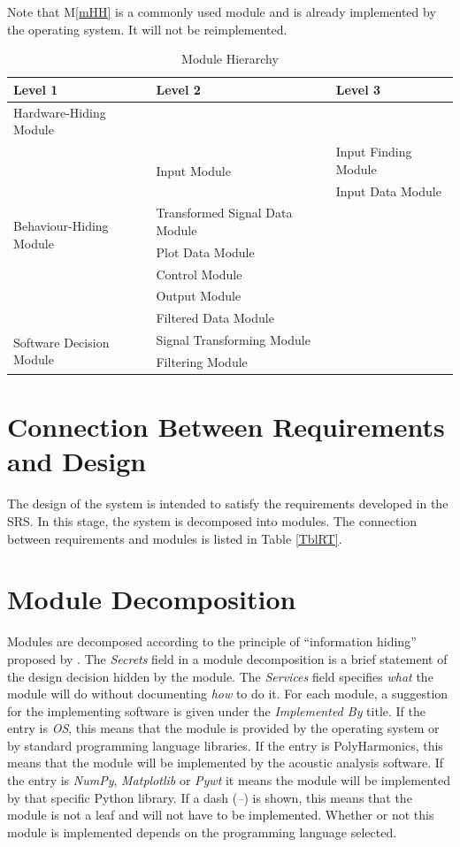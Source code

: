 \documentclass[12pt]{article}
\newcommand{\mref}[1]{M\ref{#1}}
\newcommand{\progname}{PolyHarmonics}
\begin{document}
Note that \mref{mHH} is a commonly used module and is already implemented by the 
operating
system.  It will not be reimplemented.

\begin{table}[h!]
\centering
\caption{Module Hierarchy}
\begin{tabular}{p{} p{} p{}}
\toprule
\textbf{Level 1} & \textbf{Level 2} & \textbf{Level 3}\\
\midrule

{Hardware-Hiding Module} & ~ \\
\midrule
\multirow{7}{0.3\textwidth}{Behaviour-Hiding Module}
& \multirow{2}{0.3\textwidth}{Input Module} 
& Input Finding Module\\
& & Input Data Module\\  
& Transformed Signal Data Module\\ 
& Plot Data Module\\ 
& Control Module\\ 
& Output Module\\ 
& Filtered Data Module\\
\midrule
\multirow{3}{0.3\textwidth}{Software Decision Module}
&Signal Transforming Module\\ 
& Filtering Module\\
\bottomrule
\end{tabular}
\label{TblMH}
\end{table}

\section{Connection Between Requirements and Design} \label{SecConnection}

The design of the system is intended to satisfy the requirements developed in
the SRS. In this stage, the system is decomposed into modules. The connection
between requirements and modules is listed in Table \ref{TblRT}.

\section{Module Decomposition} \label{SecMD}
Modules are decomposed according to the principle of ``information hiding''
proposed by \citet{ParnasEtAl1984}. The \emph{Secrets} field in a module
decomposition is a brief statement of the design decision hidden by the
module. The \emph{Services} field specifies \emph{what} the module will do
without documenting \emph{how} to do it. For each module, a suggestion for the
implementing software is given under the \emph{Implemented By} title. If the
entry is \emph{OS}, this means that the module is provided by the operating
system or by standard programming language libraries. If the entry is
\progname{}, this means that the module will be implemented by the 
acoustic analysis software. If the entry is \emph{NumPy}, \emph{Matplotlib} or
 \emph{Pywt} it means the module will be implemented by that specific Python 
library. If a dash (\emph{--}) is shown, this means
that the module is not a leaf and will not have to be implemented. Whether or
not this module is implemented depends on the programming language
selected.
\end{document}
